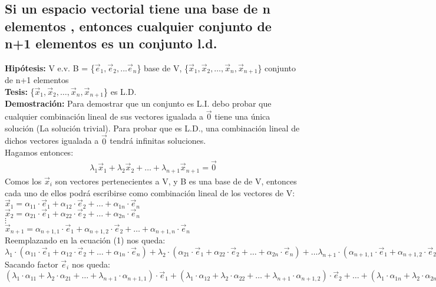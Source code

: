 \documentclass[11pt]{article}
\begin{document}
\subsection{Si un espacio vectorial tiene una  base de n 
elementos , entonces cualquier conjunto de n+1 
elementos es un conjunto l.d.}
{\bfseries {Hipótesis:}} V e.v. B = \{$\vec{e}_{1}, \vec{e}_2,... \vec{e}_n $\} base de V, \{$\vec{x}_{1}, \vec{x}_2,\hdots, \vec{x}_n, \vec{x}_{n+1} $\} conjunto de n+1 elementos\\
{\bfseries {Tesis:}} \{$\vec{x}_{1}, \vec{x}_2,\hdots, \vec{x}_n, \vec{x}_{n+1} $\} es L.D.\\
{\bfseries Demostración:} Para demostrar que un conjunto es L.I.  debo probar que cualquier combinación lineal de sus vectores igualada a $\vec{0}$ tiene una única solución (La solución trivial). Para probar que es L.D., una combinación lineal de dichos vectores igualada a $\vec{0}$ tendrá infinitas soluciones. \\ Hagamos entonces: 
\begin{align}
\lambda_1\vec{x}_1+\lambda_2\vec{x}_2+\hdots+\lambda_{n+1}\vec{x}_{n+1} = \vec{0}
\end{align}
Comos los $\vec{x}_i$ son vectores pertenecientes a V, y B es una base de de V, entonces cada uno de ellos podrá escribirse como combinación lineal de los vectores de V:\\
$\vec{x}_1=\alpha_{11}\cdot\vec{e}_1+\alpha_{12}\cdot\vec{e}_2+\hdots+\alpha_{1n}\cdot\vec{e}_n$\\
$\vec{x}_2=\alpha_{21}\cdot\vec{e}_1+\alpha_{22}\cdot\vec{e}_2+\hdots+\alpha_{2n}\cdot\vec{e}_n$\\
$\vdots$\\
$\vec{x}_{n+1}=\alpha_{n+1,1}\cdot\vec{e}_1+\alpha_{n+1,2}\cdot\vec{e}_2+\hdots+\alpha_{n+1,n}\cdot\vec{e}_n$\\
Reemplazando en la ecuación (1) nos queda:\\
$\lambda_1\cdot(\alpha_{11}\cdot\vec{e}_1+\alpha_{12}\cdot\vec{e}_2+\hdots+\alpha_{1n}\cdot\vec{e}_n) + \lambda_2\cdot(\alpha_{21}\cdot\vec{e}_1+\alpha_{22}\cdot\vec{e}_2+\hdots+\alpha_{2n}\cdot\vec{e}_n) + \hdots \lambda_{n+1}\cdot(\alpha_{n+1,1}\cdot\vec{e}_1+\alpha_{n+1,2}\cdot\vec{e}_2+\hdots+\alpha_{n+1,n}\cdot\vec{e}_n)$\\
Sacando factor $\vec{e}_i$ nos queda:
$(\lambda_1\cdot\alpha_{11} + \lambda_2\cdot\alpha_{21} + \hdots + \lambda_{n+1}\cdot\alpha_{n+1,1})\cdot\vec{e}_1 + (\lambda_1\cdot\alpha_{12} + \lambda_2\cdot\alpha_{22} + \hdots + \lambda_{n+1}\cdot\alpha_{n+1,2})\cdot\vec{e}_2 + \hdots + (\lambda_1\cdot\alpha_{1n} + \lambda_2\cdot\alpha_{2n} + \hdots + \lambda_{n+1}\cdot\alpha_{n+1,n})\cdot\vec{e}_n$\\
\end{document}
